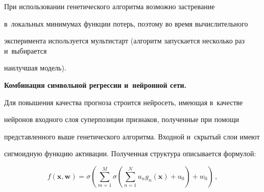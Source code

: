 















При использовании генетического алгоритма возможно застревание 

в~локальных минимумах функции потерь, поэтому во время вычислительного 

эксперимента используется мультистарт (алгоритм запускается несколько раз и~выбирается 

наилучшая модель).



\textbf{Комбинация символьной регрессии и~нейронной сети.}

Для повышения качества прогноза строится нейросеть, имеющая в~качестве 

нейронов входного слоя суперпозиции признаков, полученные при помощи 

представленного выше генетического алгоритма. Входной и~скрытый слои имеют 

сигмоидную функцию активации. Полученная структура описывается формулой:

\begin{equation}

\label{nn-structure}

    f(\mathbf{x}, \mathbf{w}) = \sigma\left(\sum\limits_{m=1}^M

    \sigma\left(\sum\limits_{n=1}^{N} u_ng_n(\mathbf{x}) + u_0 \right)+ w_0 \right)\,,

\end{equation}

